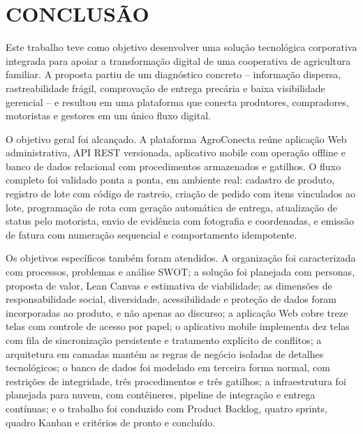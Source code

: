 \newpage
\section*{CONCLUSÃO}

Este trabalho teve como objetivo desenvolver uma solução tecnológica corporativa
integrada para apoiar a transformação digital de uma cooperativa de agricultura
familiar. A proposta partiu de um diagnóstico concreto -- informação dispersa,
rastreabilidade frágil, comprovação de entrega precária e baixa visibilidade
gerencial -- e resultou em uma plataforma que conecta produtores, compradores,
motoristas e gestores em um único fluxo digital.

O objetivo geral foi alcançado. A plataforma AgroConecta reúne aplicação Web
administrativa, API REST versionada, aplicativo mobile com operação offline e
banco de dados relacional com procedimentos armazenados e gatilhos. O fluxo
completo foi validado ponta a ponta, em ambiente real: cadastro de produto,
registro de lote com código de rastreio, criação de pedido com itens vinculados
ao lote, programação de rota com geração automática de entrega, atualização de
status pelo motorista, envio de evidência com fotografia e coordenadas, e
emissão de fatura com numeração sequencial e comportamento idempotente.

Os objetivos específicos também foram atendidos. A organização foi caracterizada
com processos, problemas e análise SWOT; a solução foi planejada com personas,
proposta de valor, Lean Canvas e estimativa de viabilidade; as dimensões de
responsabilidade social, diversidade, acessibilidade e proteção de dados foram
incorporadas ao produto, e não apenas ao discurso; a aplicação Web cobre treze
telas com controle de acesso por papel; o aplicativo mobile implementa dez telas
com fila de sincronização persistente e tratamento explícito de conflitos; a
arquitetura em camadas mantém as regras de negócio isoladas de detalhes
tecnológicos; o banco de dados foi modelado em terceira forma normal, com
restrições de integridade, três procedimentos e três gatilhos; a infraestrutura
foi planejada para nuvem, com contêineres, pipeline de integração e entrega
contínuas; e o trabalho foi conduzido com Product Backlog, quatro sprints, quadro
Kanban e critérios de pronto e concluído.

